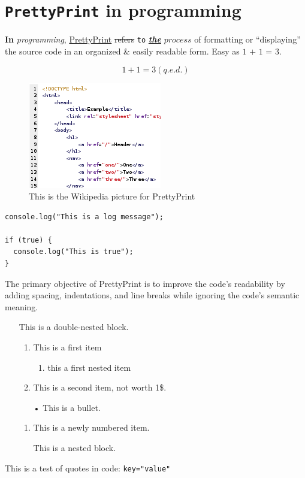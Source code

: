 \documentclass[12pt, a4paper]{scrreprt}
\makeatletter
\def\maxwidth#1{\ifdim\Gin@nat@width>#1 #1\else\Gin@nat@width\fi}
\makeatother
\begin{document}
\section{\texttt{PrettyPrint} in programming}
\textbf{In} \textit{programming}, \underline{PrettyPrint} \sout{refers} \texttt{to} \underline{\textbf{\textit{the}}} $process$ of formatting or \enquote{displaying} the source code in an organized \& easily readable form. 
 Easy as $\textit{1 + 1 = 3}$.

\begin{equation} 1 + 1 = 3 (q.e.d.)\end{equation}
\begin{figure}[h]
\includegraphics[width=\maxwidth{\linewidth}]{220px-HTML_source_code_example.png}
\centering
\caption{This is the Wikipedia picture for PrettyPrint}
\end{figure}
\begin{lstlisting}[caption=This is a sample code block with JavaScript syntax highlighting]
console.log("This is a log message");

if (true) {
  console.log("This is true");
}
\end{lstlisting}
The primary objective of PrettyPrint is to improve the code's readability by adding spacing, indentations, and line breaks while ignoring the code's semantic meaning.

\begin{itemize}
\item[ ] This is a double-nested block.

\begin{enumerate}
\item This is a first item
\begin{enumerate}
\item this a first nested item
\end{enumerate}
\item This is a second item, not worth 1\$.
\end{enumerate}
\begin{itemize}
\item[•] This is a bullet.
\end{itemize}
\begin{enumerate}
\item This is a newly numbered item.
\item[ ] This is a nested block.

\end{enumerate}
\end{itemize}
This is a test of quotes in code: \texttt{key="value"}
\end{document}
